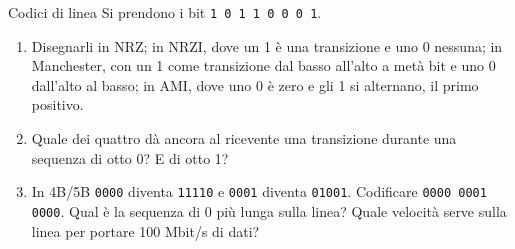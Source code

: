 \begin{esercizio}{Codici di linea}
Si prendono i bit \texttt{1 0 1 1 0 0 0 1}.
\begin{enumerate}[label=(\alph*)]
    \item Disegnarli in NRZ; in NRZI, dove un 1 è una transizione e uno 0 nessuna; in Manchester, con un 1 come transizione dal basso
          all'alto a metà bit e uno 0 dall'alto al basso; in AMI, dove uno 0 è zero e gli 1 si alternano, il primo positivo.
    \item Quale dei quattro dà ancora al ricevente una transizione durante una sequenza di otto 0? E di otto 1?
    \item In 4B/5B \texttt{0000} diventa \texttt{11110} e \texttt{0001} diventa \texttt{01001}. Codificare \texttt{0000 0001 0000}. Qual è la
          sequenza di 0 più lunga sulla linea? Quale velocità serve sulla linea per portare 100 Mbit/s di dati?
\end{enumerate}


\end{esercizio}
